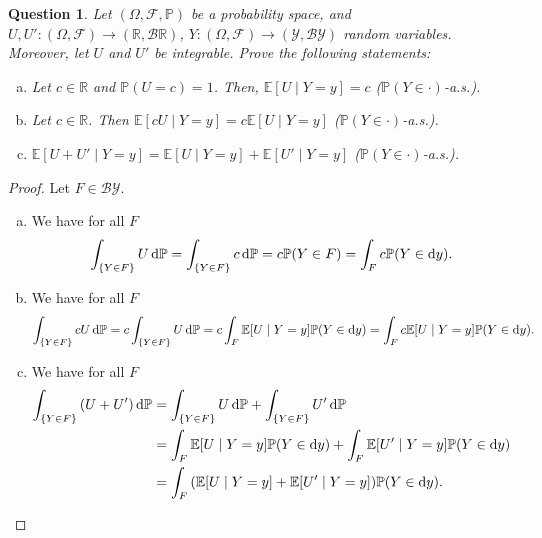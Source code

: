 \documentclass{article}
\theoremstyle{plain}
\newtheorem{question}{Question}
\theoremstyle{remark}
\newcommand{\Bb}{\mathbb}
\newcommand{\Cal}{\mathcal}
\newcommand{\PP}{\Bb P}
\newcommand{\RR}{\Bb R}
\newcommand{\EE}{\Bb E}
\newcommand\YY{\Cal Y}
\newcommand\BB{\Cal B}
\newcommand\FF{\Cal F}
\begin{document}
\begin{question}
	Let $(\Omega, \FF, \PP)$ be a probability space, and $U, U' \colon (\Omega, \FF) \to (\RR, \BB\RR)$, $Y \colon (\Omega, \FF) \to (\YY, \BB\YY)$ random variables. Moreover, let $U$ and $U'$ be integrable. Prove the following statements:
	\begin{enumerate}[(a)]
		\item Let $c \in \RR$ and $\PP(U = c) = 1$. Then, $\EE[U \mid Y = y] = c$  ($\PP(Y \in \cdot)$-a.s.). 
		\item Let $c \in \RR$. Then $\EE[cU \mid Y = y] = c \EE[U \mid Y = y]$ ($\PP(Y \in \cdot)$-a.s.).
		\item $\EE[U + U' \mid Y = y] = \EE[U \mid Y = y] + \EE[U' \mid Y = y]$ ($\PP(Y \in \cdot)$-a.s.). 
	\end{enumerate}
\end{question}

\begin{proof}
	Let $F \in \BB\YY$. 
	
	\begin{enumerate}[(a)]
		\item We have for all $F$
		\[
		\int_\qty{Y \in F} U \dd{\PP} = \int_\qty{Y \in F} c \dd{\PP} = c \PP(Y \in F) = \int_F c \PP(Y \in \dd{y}).
		\]
		\item We have for all $F$
		\[
		\int_\qty{Y \in F} cU \dd{\PP} = c \int_\qty{Y \in F} U \dd{\PP} = c \int_F \EE[U \mid Y = y] \PP(Y \in \dd{y}) = \int_F c\EE[U \mid Y = y] \PP(Y \in \dd{y}).
		\]
		
		\item We have for all $F$
		\begin{align*}
		\int_\qty{Y \in F} \qty(U + U') \dd{\PP} &= \int_\qty{Y \in F} U \dd{\PP} + \int_\qty{Y \in F} U' \dd{\PP} \\
		&= \int_F \EE[U \mid Y = y] \PP(Y \in \dd{y}) + \int_F \EE[U' \mid Y = y] \PP(Y \in \dd{y}) \\
		&= \int_F \qty( \EE[U \mid Y = y] + \EE[U' \mid Y = y]) \PP(Y \in \dd{y}).
		\end{align*}
	\end{enumerate}
\end{proof}
\end{document}
